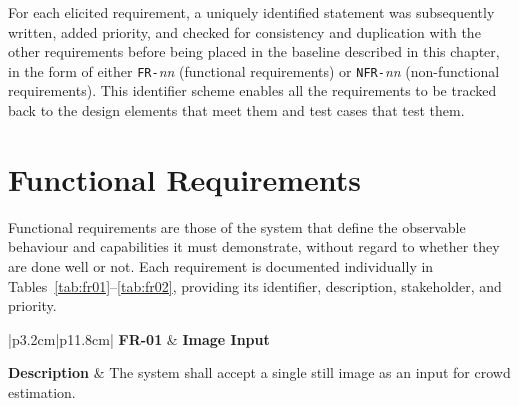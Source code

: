 For each elicited requirement, a uniquely identified statement was subsequently written, added priority, and checked for consistency and duplication with the other requirements before being placed in the baseline described in this chapter, in the form of either \texttt{FR-}\emph{nn} (functional requirements) or \texttt{NFR-}\emph{nn} (non-functional requirements). This identifier scheme enables all the requirements to be tracked back to the design elements that meet them and test cases that test them.

\section{Functional Requirements}
\label{sec:functional-requirements}

Functional requirements are those of the system that define the observable behaviour and capabilities it must demonstrate, without regard to whether they are done well or not. Each requirement is documented individually in Tables~\ref{tab:fr01}--\ref{tab:fr02}, providing its identifier, description, stakeholder, and priority.



\begin{table}[H]
	\centering
	\renewcommand{\arraystretch}{1.25}
	\begin{tabular}{|p{3.2cm}|p{11.8cm}|}
		\hline
		\textbf{FR-01} &
		\textbf{Image Input} \\ \hline
		
		\textbf{Description} &
		The system shall accept a single still image as an input for crowd estimation. \\ \hline
		
		 \\ \hline
	\end{tabular}
	\caption{Functional requirement for image input.}
	\label{tab:fr01}
\end{table}


